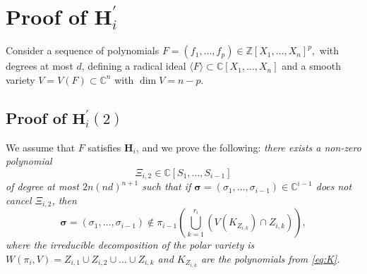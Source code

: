 \documentclass[a4paper]{article}
\newcommand{\ZZ}{{\mathbb{Z}}}
\def\C{\mathbb{C}}
\begin{document}
\section{Proof of $\textbf{H}_i^{'}$}\label{Sec:Hip}
Consider a sequence of polynomials $F= (f_1,\hdots,f_p) \in \ZZ[X_1,\hdots,X_n]^p,$ with degrees at most $d$, defining a radical ideal $\langle F \rangle \subset \C[X_1,\hdots,X_n]$ and a smooth variety $V=V(F) \subset \C^n$ with $\dim V = n-p$. %
%
\subsection{Proof of $\textbf{H}_i^{'}(2)$}\label{proof:hip2}
%
We assume that $F$ satisfies $\textbf{H}_i$, and we prove the following: {\em
  there exists a non-zero polynomial 
  \[\Xi_{i,2} \in
  \C[S_1,\dots,S_{i-1}]\] 
  of degree at most $2n(nd)^{n+1}$ such that if $
  \bm \sigma = (\sigma_1,\hdots,\sigma_{i-1}) \in \C^{i-1}$ does not cancel
  $\Xi_{i,2}$, then 
  \[\bm \sigma = (\sigma_1,\hdots,\sigma_{i-1}) \not \in \pi_{i-1} \left(\bigcup_{k=1}^{r_i} \left(V(K_{Z_{i,k}}) \cap Z_{i,k}\right)\right),\]
  where the irreducible decomposition of the polar variety is $W(\pi_i,V) = Z_{i,1} \cup Z_{i,2} \cup \hdots \cup Z_{i,k}$ and $K_{Z_{i,k}}$ are the polynomials from \eqref{eq:K}.}
\end{document}
